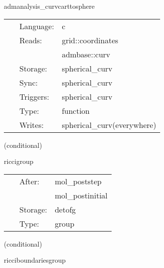 \vspace{5mm}


\hspace{5mm} admanalysis\_curvcarttosphere 

\hspace{5mm}{\it calculate the spherical ex. curvature in r, theta(q), phi(p) } 


\hspace{5mm}

 \begin{tabular*}{160mm}{cll} 
~ & Language:  & c \\ 
~ & Reads:  & grid::coordinates \\ 
~& ~ &admbase::curv\\ 
~ & Storage:  & spherical\_curv \\ 
~ & Sync:  & spherical\_curv \\ 
~ & Triggers:  & spherical\_curv \\ 
~ & Type:  & function \\ 
~ & Writes:  & spherical\_curv(everywhere) \\ 
\end{tabular*} 


\vspace{5mm}

   (conditional) 

\hspace{5mm} riccigroup 

\hspace{5mm}{\it calculate ricci tensor, with boundary conditions } 


\hspace{5mm}

 \begin{tabular*}{160mm}{cll} 
~ & After:  & mol\_poststep \\ 
~& ~ &mol\_postinitial\\ 
~ & Storage:  & detofg \\ 
~ & Type:  & group \\ 
\end{tabular*} 


\vspace{5mm}

   (conditional) 

\hspace{5mm} ricciboundariesgroup 

\hspace{5mm}{\it set ricci tensor on the boundary } 



